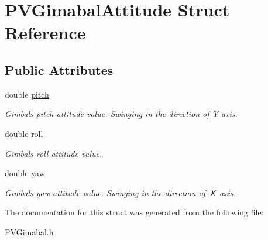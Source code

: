 \hypertarget{struct_p_v_gimabal_attitude}{}\section{P\+V\+Gimabal\+Attitude Struct Reference}
\label{struct_p_v_gimabal_attitude}
\subsection*{Public Attributes}
\begin{DoxyCompactItemize}
\item 
\mbox{\label{struct_p_v_gimabal_attitude_ac38c5044d88f34f4b9c89ee75d1b27c7}} 
double \hyperlink{struct_p_v_gimabal_attitude_ac38c5044d88f34f4b9c89ee75d1b27c7}{pitch}
\begin{DoxyCompactList}\small\item\em Gimbal\textquotesingle{}s pitch attitude value. Swinging in the direction of Y axis. \end{DoxyCompactList}\item 
\mbox{\label{struct_p_v_gimabal_attitude_ae80ea45195ccd438c706f3d43ee0968c}} 
double \hyperlink{struct_p_v_gimabal_attitude_ae80ea45195ccd438c706f3d43ee0968c}{roll}
\begin{DoxyCompactList}\small\item\em Gimbal\textquotesingle{}s roll attitude value. \end{DoxyCompactList}\item 
\mbox{\label{struct_p_v_gimabal_attitude_a5429d6588fd4224d15603e2100482020}} 
double \hyperlink{struct_p_v_gimabal_attitude_a5429d6588fd4224d15603e2100482020}{yaw}
\begin{DoxyCompactList}\small\item\em Gimbal\textquotesingle{}s yaw attitude value. Swinging in the direction of Ｘ axis. \end{DoxyCompactList}\end{DoxyCompactItemize}


The documentation for this struct was generated from the following file\+:\begin{DoxyCompactItemize}
\item 
P\+V\+Gimabal.\+h\end{DoxyCompactItemize}
